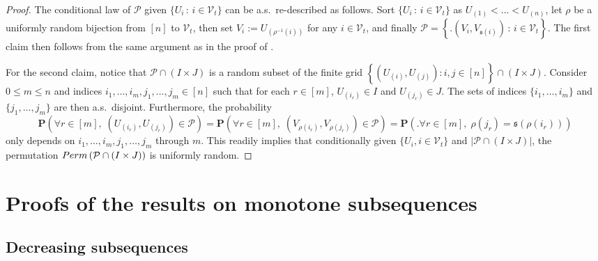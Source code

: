 \documentclass{article}
\theoremstyle{remark}
\newcommand{\card}[1]{\left|#1\right|}
\newcommand{\prob}[1]{\mathbf{P}\left(#1\right)}
\def\pts{\mathcal{P}}
\newcommand{\perm}[1]{{\rm Perm}\left(#1\right)}
\def\Vert{\mathcal{V}}
\def\s{\mathfrak{s}}
\begin{document}
\begin{proof}
    The conditional law of $\pts$ given $\{U_i \,:\, i\in\Vert_t\}$ can be a.s.~re-described as follows.
    Sort $\{U_i \,:\, i\in\Vert_t\}$ as $U_{(1)}<\dots<U_{(n)}$, let $\rho$ be a uniformly random bijection from $[n]$ to $\Vert_t$, then set $V_i := U_{(\rho^{-1}(i))}$ for any $i\in\Vert_t$, and finally $\pts = \left\{\big. (V_i,V_{\s(i)}) \,:\, i\in\Vert_t \right\}$.
    The first claim then follows from the same argument as in the proof of .

    For the second claim, notice that $\pts\cap(I\times J)$ is a random subset of the finite grid $\left\{\left(U_{(i)},U_{(j)}\right) : i,j\in[n]\right\}\cap(I\times J)$.
    Consider $0\le m\le n$ and indices $i_1,\dots,i_m, j_1,\dots,j_m \in [n]$ such that for each $r\in[m]$, $U_{(i_r)}\in I$ and $U_{(j_r)}\in J$.
    The sets of indices $\{i_1,\dots,i_m\}$ and $\{j_1,\dots,j_m\}$ are then a.s.~disjoint.
    Furthermore, the probability
    \begin{equation*}
        \prob{\forall r\in[m],\; \left(U_{(i_r)} , U_{(j_r)}\right)\in\pts}
        = \prob{\forall r\in[m],\; \left(V_{\rho(i_r)} , V_{\rho(j_r)}\right)\in\pts}
        = \prob{\big. \forall r\in[m],\; \rho(j_r) = \s(\rho(i_r))}
    \end{equation*}
    only depends on $i_1,\dots,i_m,j_1,\dots,j_m$ through $m$.
    This readily implies that conditionally given $\{U_i,i\in\Vert_t\}$ and $\card{\pts\cap(I\times J)}$, the permutation $\perm{\pts\cap(I\times J)}$ is uniformly random.
\end{proof}


\section{Proofs of the results on monotone subsequences}
\label{sec: proof LIS LDS}

\subsection{Decreasing subsequences}
\end{document}

